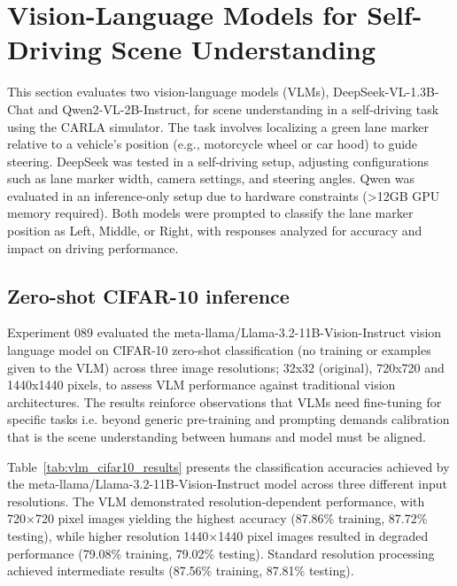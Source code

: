 

\section{Vision-Language Models for Self-Driving Scene Understanding}
\label{sec:vlm_scene_understanding}

This section evaluates two vision-language models (VLMs), DeepSeek-VL-1.3B-Chat and Qwen2-VL-2B-Instruct, for scene understanding in a self-driving task using the CARLA simulator. The task involves localizing a green lane marker relative to a vehicle's position (e.g., motorcycle wheel or car hood) to guide steering. DeepSeek was tested in a self-driving setup, adjusting configurations such as lane marker width, camera settings, and steering angles. Qwen was evaluated in an inference-only setup due to hardware constraints (>12GB GPU memory required). Both models were prompted to classify the lane marker position as Left, Middle, or Right, with responses analyzed for accuracy and impact on driving performance.


\subsection{Zero-shot CIFAR-10 inference}

Experiment 089 evaluated the meta-llama/Llama-3.2-11B-Vision-Instruct vision language model on CIFAR-10 zero-shot classification (no training or examples given to the VLM) across three image resolutions; 32x32 (original), 720x720 and 1440x1440 pixels, to assess VLM performance against traditional vision architectures. The results reinforce observations that VLMs need fine-tuning for specific tasks i.e. beyond generic pre-training and prompting demands calibration that is the scene understanding between humans and model must be aligned.

Table~\ref{tab:vlm_cifar10_results} presents the classification accuracies achieved by the meta-llama/Llama-3.2-11B-Vision-Instruct model across three different input resolutions. The VLM demonstrated resolution-dependent performance, with 720×720 pixel images yielding the highest accuracy (87.86\% training, 87.72\% testing), while higher resolution 1440×1440 pixel images resulted in degraded performance (79.08\% training, 79.02\% testing). Standard resolution processing achieved intermediate results (87.56\% training, 87.81\% testing).

